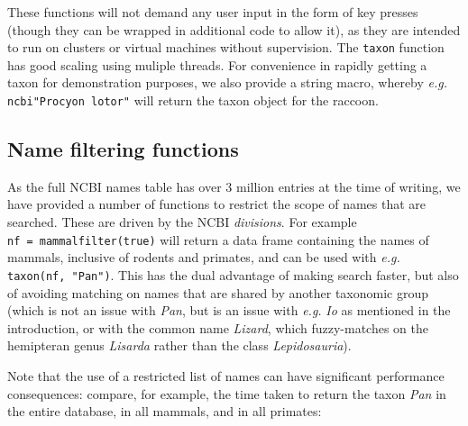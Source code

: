 \documentclass[11pt]{article}
\begin{document}
These functions will not demand any user input in the form of key
presses (though they can be wrapped in additional code to allow it), as
they are intended to run on clusters or virtual machines without
supervision. The \texttt{taxon} function has good scaling using muliple
threads. For convenience in rapidly getting a taxon for demonstration
purposes, we also provide a string macro, whereby \emph{e.g.}
\texttt{ncbi"Procyon\ lotor"} will return the taxon object for the
raccoon.

\hypertarget{name-filtering-functions}{%
\subsection{Name filtering functions}\label{name-filtering-functions}}

As the full NCBI names table has over 3 million entries at the time of
writing, we have provided a number of functions to restrict the scope of
names that are searched. These are driven by the NCBI \emph{divisions}.
For example \texttt{nf\ =\ mammalfilter(true)} will return a data frame
containing the names of mammals, inclusive of rodents and primates, and
can be used with \emph{e.g.} \texttt{taxon(nf,\ "Pan")}. This has the
dual advantage of making search faster, but also of avoiding matching on
names that are shared by another taxonomic group (which is not an issue
with \emph{Pan}, but is an issue with \emph{e.g.} \emph{Io} as mentioned
in the introduction, or with the common name \emph{Lizard}, which
fuzzy-matches on the hemipteran genus \emph{Lisarda} rather than the
class \emph{Lepidosauria}).

Note that the use of a restricted list of names can have significant
performance consequences: compare, for example, the time taken to return
the taxon \emph{Pan} in the entire database, in all mammals, and in all
primates:
\end{document}
